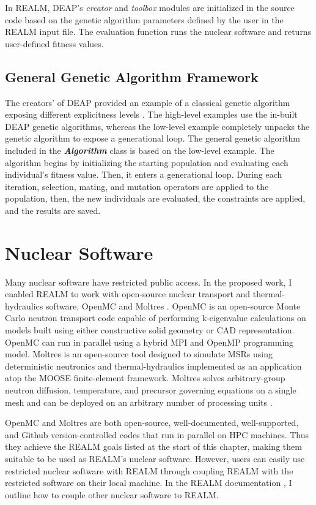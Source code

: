 In REALM, DEAP's \textit{creator} and \textit{toolbox} modules are initialized 
in the source code based on the genetic algorithm parameters defined by the user 
in the REALM input file. 
The evaluation function runs the nuclear software and returns user-defined 
fitness values. 

\subsection{General Genetic Algorithm Framework}
The creators' of DEAP provided an example of a classical genetic algorithm 
exposing different explicitness levels \cite{fortin_deap_2012}. 
The high-level examples use the in-built DEAP genetic algorithms, 
whereas the low-level example completely unpacks the genetic algorithm to expose 
a generational loop. 
The general genetic algorithm included in the \textbf{\textit{Algorithm}} class 
is based on the low-level example. 
The algorithm begins by initializing the starting population and evaluating 
each individual's fitness value. 
Then, it enters a generational loop. 
During each iteration, selection, mating, and mutation operators are applied to 
the population, then, the new individuals are evaluated, the constraints are 
applied, and the results are saved.


\section{Nuclear Software}
Many nuclear software have restricted public access. 
In the proposed work, I enabled \gls{REALM} to work with open-source nuclear 
transport and thermal-hydraulics software, OpenMC \cite{romano_openmc_2013} 
and Moltres \cite{lindsay_introduction_2018}.  
OpenMC is an open-source Monte Carlo neutron transport code capable of 
performing k-eigenvalue calculations on models built using either constructive 
solid geometry or CAD representation. 
OpenMC can run in parallel using a hybrid \gls{MPI} and OpenMP programming model. 
Moltres is an open-source tool designed to simulate \glspl{MSR} using 
deterministic neutronics and thermal-hydraulics implemented as an application 
atop the \gls{MOOSE} finite-element framework.  
Moltres solves arbitrary-group neutron diffusion, temperature, and precursor 
governing equations on a single mesh and can be deployed on an arbitrary number 
of processing units \cite{lindsay_introduction_2018}.

OpenMC and Moltres are both open-source, well-documented, well-supported, and 
Github version-controlled codes that run in parallel on \gls{HPC} machines.
Thus they achieve the \gls{REALM} goals listed at the start of this chapter, 
making them suitable to be used as \gls{REALM}'s nuclear software.
However, users can easily use restricted nuclear software with \gls{REALM} 
through coupling \gls{REALM} with the restricted software on their local machine. 
In the REALM documentation \cite{chee_arfcrealm_2021}, I outline how to couple 
other nuclear software to REALM. 

